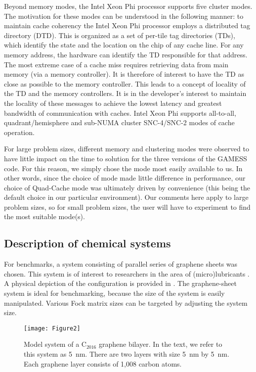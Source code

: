 Beyond memory modes, the Intel Xeon Phi processor supports five cluster modes. The motivation for these modes can be understood in the following manner: to maintain cache coherency the Intel Xeon Phi processor employs a distributed tag directory (DTD). This is organized as a set of per-tile tag directories (TDs), which identify the state and the location on the chip of any cache line. For any memory address, the hardware can identify the TD responsible for that address. The most extreme case of a cache miss requires retrieving data from main memory (via a memory controller). It is therefore of interest to have the TD as close as possible to the memory controller. This leads to a concept of locality of the TD and the memory controllers.
It is in the developer's interest to maintain the locality of these messages to achieve the lowest latency and greatest bandwidth of communication with caches. Intel Xeon Phi supports all-to-all, quadrant/hemisphere and sub-NUMA cluster SNC-4/SNC-2 modes of cache operation.

For large problem sizes, different memory and clustering modes were observed to have little impact on the time to solution for the three versions of the GAMESS code. For this reason, we simply chose the mode most easily available to us. In other words, since the choice of mode made little difference in performance, our choice of Quad-Cache mode was ultimately driven by convenience (this being the default choice in our particular environment). Our comments here apply to large problem sizes, so for small problem sizes, the user will have to experiment to find the most suitable mode(s).


\subsection{Description of chemical systems}
\label{ssec:chemical}
For benchmarks, a system consisting of parallel series of graphene sheets was chosen. This system is of interest to researchers in the area of (micro)lubricants \cite{kawai2016superlubricity}. A physical depiction of the configuration is provided in . The graphene-sheet system is ideal for benchmarking, because the size of the system is easily manipulated. Various Fock matrix sizes can be targeted by adjusting the system size.

\begin{figure}
	\texttt{[image: Figure2]}
	\caption{Model system of a C$_{2016}$ graphene bilayer. In the text, we refer to this system as 5~nm.
    		 There are two layers with size 5~nm by 5~nm.
             Each graphene layer consists of 1,008 carbon atoms.}
    \label{fig:graphene}
\end{figure}

